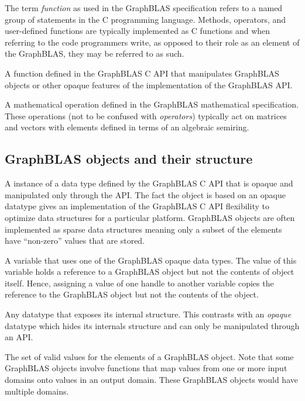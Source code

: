  The term \emph{function} as used in the GraphBLAS specification
refers to a named group of statements in the C programming language.  Methods, operators,
and user-defined functions are typically implemented as C functions and when referring to 
the code programmers write, as opposed to their role as an element of the GraphBLAS, they may
be referred to as such.

 A function defined in the GraphBLAS C API that manipulates
GraphBLAS objects or other opaque features of the implementation of the GraphBLAS API.

 A mathematical operation defined in the
GraphBLAS mathematical specification. These operations (not to be confused with \emph{operators}) typically act
on matrices and vectors with elements defined in terms of an algebraic semiring. 
\glossEnd

\subsection{GraphBLAS objects and their structure}

\glossBegin
{}  A instance of a data type defined by the GraphBLAS C
API that is opaque and manipulated only through the API.  The fact the object
is based on an opaque datatype gives an implementation of the GraphBLAS C API
flexibility to optimize data structures for a particular platform.  GraphBLAS objects
are often implemented as sparse data structures meaning only a subset of the
elements have ``non-zero'' values that are stored.

  A variable that uses one of the GraphBLAS opaque data types.
The value of this variable holds a reference to a GraphBLAS object but not the contents of object itself.  
Hence, assigning a value of one handle to another variable copies the reference to the GraphBLAS object
but not the contents of the object.

 Any datatype that exposes its internal structure.   This contrasts
with an \emph{opaque} datatype which hides its internals structure and can only
be manipulated through an API.

 The set of valid values for the elements of a GraphBLAS object.
Note that some GraphBLAS objects involve functions that map values from one or more input domains 
onto values in an output domain.  These GraphBLAS objects would have multiple domains.

